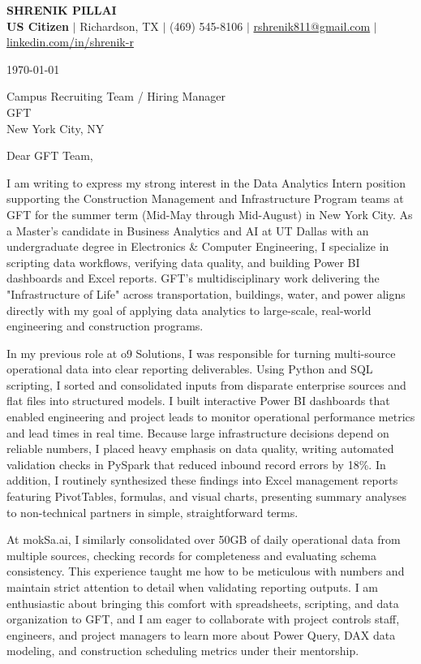 \documentclass[11pt,letterpaper]{article}
\begin{document}
{\LARGE \textbf{SHRENIK PILLAI}} \\
\textbf{US Citizen} $|$ Richardson, TX $|$ (469) 545-8106 $|$ \href{mailto:rshrenik811@gmail.com}{rshrenik811@gmail.com} $|$ \href{https://linkedin.com/in/shrenik-r}{linkedin.com/in/shrenik-r}

\vspace{10pt}

\today

Campus Recruiting Team / Hiring Manager \\
GFT \\
New York City, NY

\vspace{10pt}

Dear GFT Team,

I am writing to express my strong interest in the Data Analytics Intern position supporting the Construction Management and Infrastructure Program teams at GFT for the summer term (Mid-May through Mid-August) in New York City. As a Master's candidate in Business Analytics and AI at UT Dallas with an undergraduate degree in Electronics \& Computer Engineering, I specialize in scripting data workflows, verifying data quality, and building Power BI dashboards and Excel reports. GFT's multidisciplinary work delivering the "Infrastructure of Life" across transportation, buildings, water, and power aligns directly with my goal of applying data analytics to large-scale, real-world engineering and construction programs.

In my previous role at o9 Solutions, I was responsible for turning multi-source operational data into clear reporting deliverables. Using Python and SQL scripting, I sorted and consolidated inputs from disparate enterprise sources and flat files into structured models. I built interactive Power BI dashboards that enabled engineering and project leads to monitor operational performance metrics and lead times in real time. Because large infrastructure decisions depend on reliable numbers, I placed heavy emphasis on data quality, writing automated validation checks in PySpark that reduced inbound record errors by 18\%. In addition, I routinely synthesized these findings into Excel management reports featuring PivotTables, formulas, and visual charts, presenting summary analyses to non-technical partners in simple, straightforward terms.

At mokSa.ai, I similarly consolidated over 50GB of daily operational data from multiple sources, checking records for completeness and evaluating schema consistency. This experience taught me how to be meticulous with numbers and maintain strict attention to detail when validating reporting outputs. I am enthusiastic about bringing this comfort with spreadsheets, scripting, and data organization to GFT, and I am eager to collaborate with project controls staff, engineers, and project managers to learn more about Power Query, DAX data modeling, and construction scheduling metrics under their mentorship.
\end{document}
